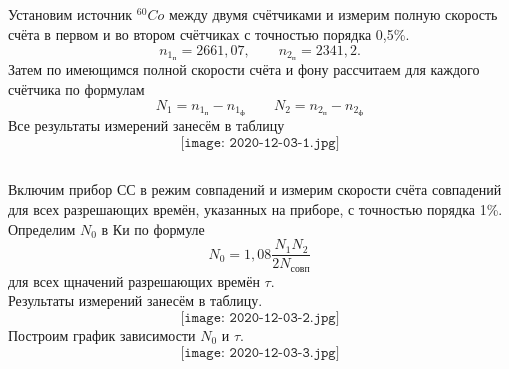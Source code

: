 \documentclass[a4paper,12pt]{article}
\begin{document}
\subsection{}

Установим источник $^{60}Co$ между двумя счётчиками и измерим полную скорость счёта
в первом и во втором счётчиках с точностью порядка 0,5\%.
\begin{equation*}
	n_{1_\text{п}}=2661,07,\quad\quad n_{2_\text{п}}=2341,2.
\end{equation*}
Затем по имеющимся полной скорости счёта и фону рассчитаем для каждого счётчика
по формулам
\begin{equation*}
	N_1=n_{1_\text{п}}-n_{1_\text{ф}}\quad\quad N_2=n_{2_\text{п}}-n_{2_\text{ф}}
\end{equation*}
Все результаты измерений занесём в таблицу
$$\texttt{[image: 2020-12-03-1.jpg]}$$

\subsection{}

Включим прибор СС в режим совпадений и измерим скорости счёта совпадений для всех
разрешающих времён, указанных на приборе, с точностью порядка 1\%.
Определим $N_0$ в Ки по формуле
\begin{equation}
	N_0=1,08\frac{N_1N_2}{2N_\text{совп}}
\end{equation}
для всех щначений разрешающих времён $\tau$.\\
Результаты измерений занесём в таблицу.
$$\texttt{[image: 2020-12-03-2.jpg]}$$
Построим график зависимости $N_0$ и $\tau$.
$$\texttt{[image: 2020-12-03-3.jpg]}$$
\end{document}
